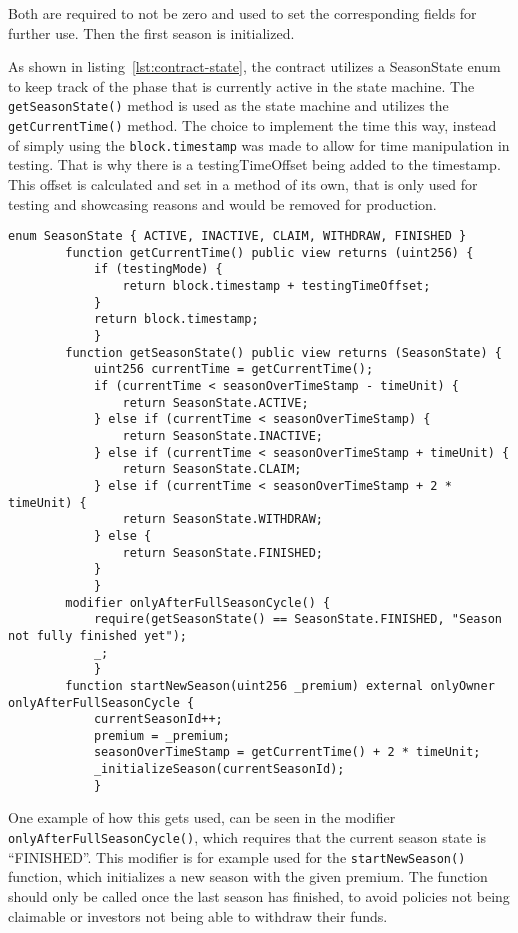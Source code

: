 \documentclass[11pt,a4paper]{article}
\begin{document}
		Both are required to not be zero and used to set the corresponding fields for further use.
		Then the first season is initialized.

		As shown in listing~\ref{lst:contract-state}, the contract utilizes a SeasonState enum to keep track of the phase that is currently active in the state machine.
		The \texttt{getSeasonState()} method is used as the state machine and utilizes the \texttt{getCurrentTime()} method.
		The choice to implement the time this way, instead of simply using the \texttt{block.timestamp} was made to allow for time manipulation in testing.
		That is why there is a testingTimeOffset being added to the timestamp.
		This offset is calculated and set in a method of its own, that is only used for testing and showcasing reasons and would be removed for production.

		\begin{lstlisting}[style=soliditystyle, caption={Excerpt: RainyDayFund.sol - StateMachine},label={lst:contract-state}]
		enum SeasonState { ACTIVE, INACTIVE, CLAIM, WITHDRAW, FINISHED }
		function getCurrentTime() public view returns (uint256) {
			if (testingMode) {
				return block.timestamp + testingTimeOffset;
			}
			return block.timestamp;
			}
        function getSeasonState() public view returns (SeasonState) {
            uint256 currentTime = getCurrentTime();
            if (currentTime < seasonOverTimeStamp - timeUnit) {
                return SeasonState.ACTIVE;
            } else if (currentTime < seasonOverTimeStamp) {
                return SeasonState.INACTIVE;
            } else if (currentTime < seasonOverTimeStamp + timeUnit) {
                return SeasonState.CLAIM;
            } else if (currentTime < seasonOverTimeStamp + 2 * timeUnit) {
                return SeasonState.WITHDRAW;
            } else {
                return SeasonState.FINISHED;
            }
            }
        modifier onlyAfterFullSeasonCycle() {
            require(getSeasonState() == SeasonState.FINISHED, "Season not fully finished yet");
            _;
            }
        function startNewSeason(uint256 _premium) external onlyOwner onlyAfterFullSeasonCycle {
            currentSeasonId++;
            premium = _premium;
            seasonOverTimeStamp = getCurrentTime() + 2 * timeUnit;
            _initializeSeason(currentSeasonId);
            }
		\end{lstlisting}

		One example of how this gets used, can be seen in the modifier \texttt{onlyAfterFullSeasonCycle()}, which requires that the current season state is \enquote{FINISHED}.
		This modifier is for example used for the \texttt{startNewSeason()} function, which initializes a new season with the given premium.
		The function should only be called once the last season has finished, to avoid policies not being claimable or investors not being able to withdraw their funds.
\end{document}
